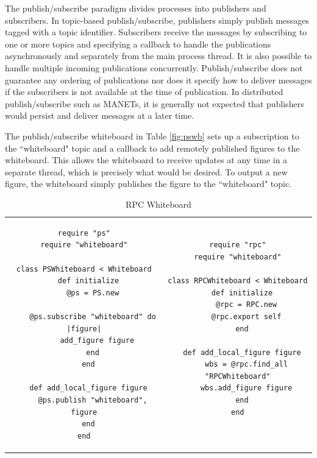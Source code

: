\documentclass{llncs}
\begin{document}
The publish/subscribe paradigm divides processes into publishers and subscribers. In topic-based publish/subscribe, publishers simply publish messages tagged with a topic identifier. Subscribers receive the messages by subscribing to one or more topics and specifying a callback to handle the publications asynchronously and separately from the main process thread. It is also possible to handle multiple incoming publications concurrently. Publish/subscribe does not guarantee any ordering of publications nor does it specify how to deliver messages if the subscribers is not available at the time of publication. In distributed publish/subscribe such as MANETs, it is generally not expected that publishers would persist and deliver messages at a later time\cite{psfaces}.

The publish/subscribe whiteboard in Table \ref{fig:pswb} sets up a subscription to the ``whiteboard" topic and a callback to add remotely published figures to the whiteboard. This allows the whiteboard to receive updates at any time in a separate thread, which is precisely what would be desired. To output a new figure, the whiteboard simply publishes the figure to the ``whiteboard" topic.

\begin{table}
\centering
\begin{tabular}{c c}
\begin{minipage}{2.75in}
\begin{verbatim}
require "ps"
require "whiteboard"

class PSWhiteboard < Whiteboard
  def initialize
    @ps = PS.new
    
    @ps.subscribe "whiteboard" do |figure|
      add_figure figure
    end
  end

  def add_local_figure figure
    @ps.publish "whiteboard", figure
  end
end
\end{verbatim}
\caption{Publish/Subscribe Whiteboard}
\end{minipage}\label{fig:pswb}
&
\begin{minipage}{2.5in}
\begin{verbatim}
require "rpc"
require "whiteboard"

class RPCWhiteboard < Whiteboard
  def initialize
    @rpc = RPC.new
    @rpc.export self
  end

  def add_local_figure figure
    wbs = @rpc.find_all "RPCWhiteboard"
    wbs.add_figure figure
  end
end


\end{verbatim}
\caption{RPC Whiteboard}
\end{minipage}\label{fig:rpcwb}
\end{tabular}
\end{table}
\end{document}

